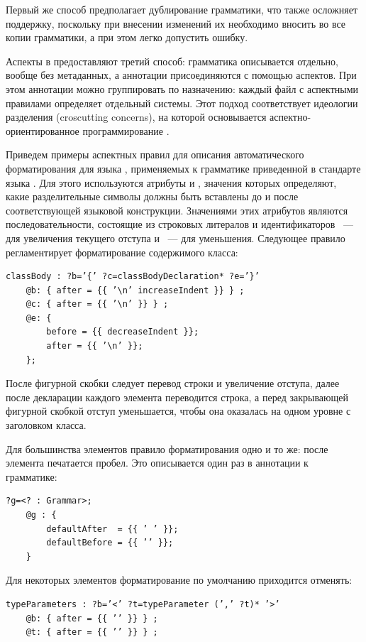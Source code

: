 Первый же способ предполагает дублирование грамматики, что также осложняет поддержку, поскольку при внесении изменений их необходимо вносить во все копии грамматики, а при этом легко допустить ошибку.

Аспекты в \GRM{} предоставляют третий способ: грамматика описывается отдельно, вообще без метаданных, а аннотации присоединяются с помощью аспектов. При этом аннотации можно группировать по назначению: каждый файл с аспектными правилами определяет отдельный  системы. Этот подход соответствует идеологии разделения  (croscutting concerns), на которой основывается аспектно-ориентированное программирование \cite{AOP}.

Приведем примеры аспектных правил для описания автоматического форматирования для языка , применяемых к грамматике приведенной в стандарте языка . Для этого используются атрибуты  и , значения которых определяют, какие разделительные символы должны быть вставлены до и после соответствующей языковой конструкции. Значениями этих атрибутов являются последовательности, состоящие из строковых литералов и идентификаторов ~--- для увеличения текущего отступа и ~--- для уменьшения. Следующее правило регламентирует форматирование содержимого класса: 
\begin{lstlisting}
classBody : ?b=’{’ ?c=classBodyDeclaration* ?e=’}’
    @b: { after = {{ ’\n’ increaseIndent }} } ;
    @c: { after = {{ ’\n’ }} } ;
    @e: {
        before = {{ decreaseIndent }};
        after = {{ ’\n’ }};
    };
\end{lstlisting}
После фигурной скобки следует перевод строки и увеличение отступа, далее после декларации каждого элемента переводится строка, а перед закрывающей фигурной скобкой отступ уменьшается, чтобы она оказалась на одном уровне с заголовком класса.

Для большинства элементов правило форматирования одно и то же: после элемента печатается пробел. Это описывается один раз в аннотации к грамматике:
\begin{lstlisting}
?g=<? : Grammar>;
	@g : {
	    defaultAfter  = {{ ’ ’ }};
    	defaultBefore = {{ ’’ }};
	}
\end{lstlisting}

Для некоторых элементов форматирование по умолчанию приходится отменять:
\begin{lstlisting}
typeParameters : ?b=’<’ ?t=typeParameter (’,’ ?t)* ’>’
    @b: { after = {{ ’’ }} } ;
    @t: { after = {{ ’’ }} } ;
\end{lstlisting}

